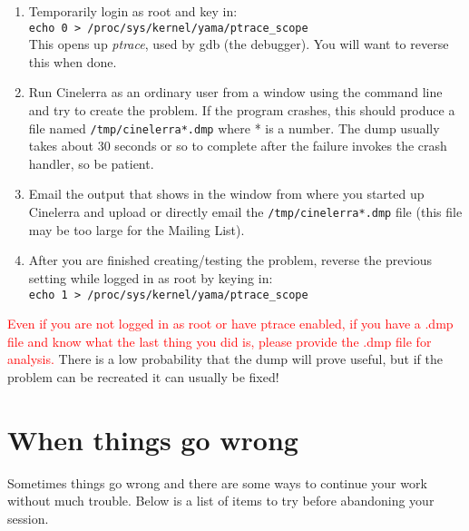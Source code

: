 \begin{enumerate}[nosep]
	\item Temporarily login as root and key in:\\
	\texttt{echo 0 > /proc/sys/kernel/yama/ptrace\_scope} \\
	This opens up \textit{ptrace}, used by gdb (the debugger). You will want to reverse this when done.
	\item Run Cinelerra as an ordinary user from a window using the command line and try to create the problem. If the program crashes, this should produce a file named \texttt{/tmp/cinelerra*.dmp} where * is a number. The dump usually takes about 30 seconds or so to complete after the failure invokes the crash handler, so be patient. 
	\item Email the output that shows in the window from where you started up Cinelerra and upload or directly email the \texttt{/tmp/cinelerra*.dmp} file (this file may be too large for the Mailing List).
	\item After you are finished creating/testing the problem, reverse the previous setting while logged in as root by keying in:\\
	\texttt{echo 1 > /proc/sys/kernel/yama/ptrace\_scope}
\end{enumerate}

\textcolor{red}{Even if you are not logged in as root or have ptrace enabled, if you
have a .dmp file and know what the last thing you did is, please provide the .dmp file for analysis.} There is a low
probability that the dump will prove useful, but if the problem can be recreated it can usually be fixed!

\section{When things go wrong}%
\label{cha:when_things_go_wrong}
Sometimes things go wrong and there are some ways to continue your work without much trouble. Below is a list of items
to try before abandoning your session.

